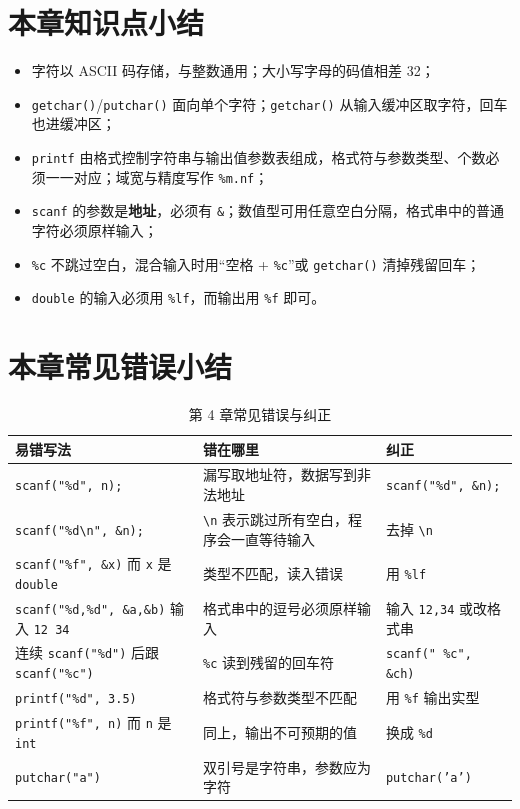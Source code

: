\section{本章知识点小结}

\begin{itemize}
  \item 字符以 ASCII 码存储，与整数通用；大小写字母的码值相差 32；
  \item \texttt{getchar()}/\texttt{putchar()} 面向单个字符；\texttt{getchar()} 从输入缓冲区取字符，回车也进缓冲区；
  \item \texttt{printf} 由格式控制字符串与输出值参数表组成，格式符与参数类型、个数必须一一对应；域宽与精度写作 \texttt{\%m.nf}；
  \item \texttt{scanf} 的参数是\textbf{地址}，必须有 \texttt{\&}；数值型可用任意空白分隔，格式串中的普通字符必须原样输入；
  \item \texttt{\%c} 不跳过空白，混合输入时用“空格 + \texttt{\%c}”或 \texttt{getchar()} 清掉残留回车；
  \item \texttt{double} 的输入必须用 \texttt{\%lf}，而输出用 \texttt{\%f} 即可。
\end{itemize}

\section{本章常见错误小结}

\begin{table}[htbp]
\centering
\caption{第 4 章常见错误与纠正}
\small
\begin{tabularx}{\textwidth}{@{}lXl@{}}
\toprule
易错写法 & 错在哪里 & 纠正 \\
\midrule
\texttt{scanf("\%d", n);} & 漏写取地址符，数据写到非法地址 & \texttt{scanf("\%d", \&n);} \\
\texttt{scanf("\%d\textbackslash n", \&n);} & \texttt{\textbackslash n} 表示跳过所有空白，程序会一直等待输入 & 去掉 \texttt{\textbackslash n} \\
\texttt{scanf("\%f", \&x)} 而 \texttt{x} 是 \texttt{double} & 类型不匹配，读入错误 & 用 \texttt{\%lf} \\
\texttt{scanf("\%d,\%d", \&a,\&b)} 输入 \texttt{12 34} & 格式串中的逗号必须原样输入 & 输入 \texttt{12,34} 或改格式串 \\
连续 \texttt{scanf("\%d")} 后跟 \texttt{scanf("\%c")} & \texttt{\%c} 读到残留的回车符 & \texttt{scanf(" \%c", \&ch)} \\
\texttt{printf("\%d", 3.5)} & 格式符与参数类型不匹配 & 用 \texttt{\%f} 输出实型 \\
\texttt{printf("\%f", n)} 而 \texttt{n} 是 \texttt{int} & 同上，输出不可预期的值 & 换成 \texttt{\%d} \\
\texttt{putchar("a")} & 双引号是字符串，参数应为字符 & \texttt{putchar('a')} \\
\bottomrule
\end{tabularx}
\end{table}
